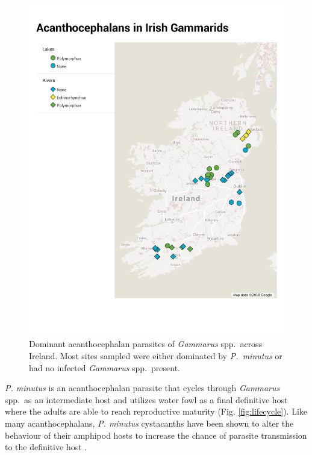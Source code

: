 
\begin{figure}[H] %
	  \centering
	  \includegraphics[keepaspectratio,width=\textwidth]{figures/ch1/acanth_map.pdf}
	   \vspace*{-2.5cm}
	    \caption[Dominant Acanthocephalan parasites of \emph{Gammarus} spp.\ across Ireland] 
	    {Dominant acanthocephalan parasites of \emph{Gammarus} spp.\ across Ireland. Most sites sampled were either dominated by \emph{P.\ minutus} or had no infected \emph{Gammarus} spp.\ present.}
	  \label{fig:acanth_map}
	\end{figure}
	

\emph{P. minutus} is an acanthocephalan parasite that cycles through \emph{Gammarus} spp.\ as an intermediate host and utilizes water fowl as a final definitive host where the adults are able to reach reproductive maturity (Fig. \ref{fig:lifecycle}). Like many acanthocephalans, \emph{P. minutus} cystacanths have been shown to alter the behaviour of their amphipod hosts to increase the chance of parasite transmission to the definitive host \citep{jacquin2014, labaude2017}. 

